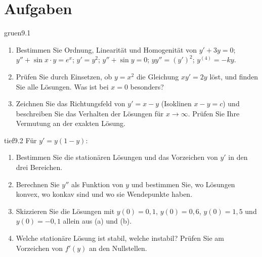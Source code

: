 \section{Aufgaben}

\begin{karte}{gruen}{9.1}{\typwerk}{}
\begin{enumerate}[label=(\alph*),leftmargin=1.6em,itemsep=2pt]
\item Bestimmen Sie Ordnung, Linearität und Homogenität von $y' + 3y = 0$; $y'' + \sin x\cdot y = e^{x}$; $y' = y^{2}$; $y'' + \sin y = 0$; $yy'' = (y')^{2}$; $y^{(4)} = -ky$.
\item Prüfen Sie durch Einsetzen, ob $y = x^{2}$ die Gleichung $xy' = 2y$ löst, und finden Sie alle Lösungen. Was ist bei $x = 0$ besonders?
\item Zeichnen Sie das Richtungsfeld von $y' = x - y$ (Isoklinen $x - y = c$) und beschreiben Sie das Verhalten der Lösungen für $x\to\infty$. Prüfen Sie Ihre Vermutung an der exakten Lösung.
\end{enumerate}
\end{karte}

\begin{karte}{tief}{9.2}{\typtypisch}{}
Für $y' = y(1 - y)$:
\begin{enumerate}[label=(\alph*),leftmargin=1.6em,itemsep=2pt]
\item Bestimmen Sie die stationären Lösungen und das Vorzeichen von $y'$ in den drei Bereichen.
\item Berechnen Sie $y''$ als Funktion von $y$ und bestimmen Sie, wo Lösungen konvex, wo konkav sind und wo sie Wendepunkte haben.
\item Skizzieren Sie die Lösungen mit $y(0) = 0{,}1$, $y(0) = 0{,}6$, $y(0) = 1{,}5$ und $y(0) = -0{,}1$ allein aus (a) und (b).
\item Welche stationäre Lösung ist stabil, welche instabil? Prüfen Sie am Vorzeichen von $f'(y)$ an den Nullstellen.
\end{enumerate}
\end{karte}

